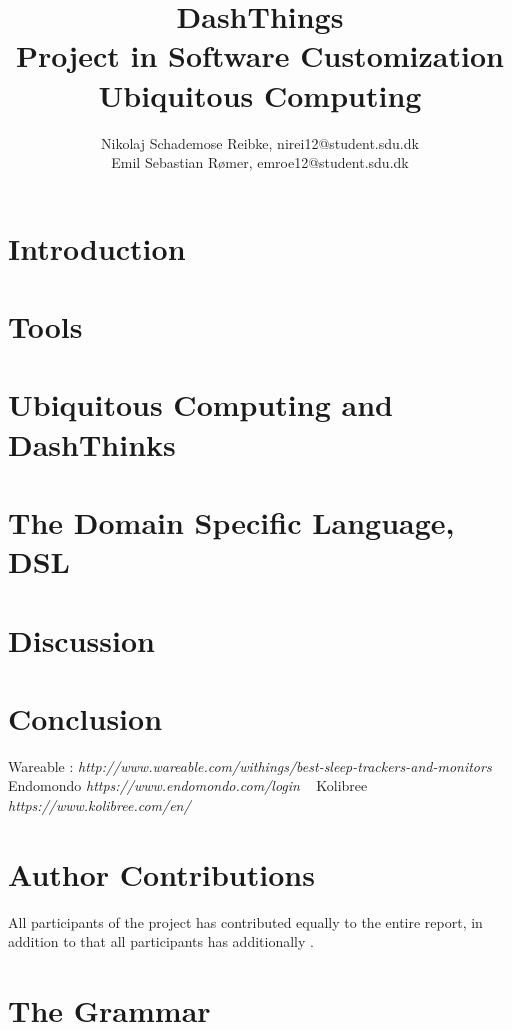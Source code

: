 \documentclass[10pt,a4paper,twocolumn]{article}
\begin{document}
\title{\textbf{DashThings \\ Project in Software Customization Ubiquitous Computing}}

\author{Nikolaj Schademose Reibke, nirei12@student.sdu.dk\\Emil Sebastian R{\o}mer, emroe12@student.sdu.dk}

\maketitle

\section{Introduction}


\section{Tools}


\section{Ubiquitous Computing and DashThinks}


\section{The Domain Specific Language, DSL}


\section{Discussion}


\section{Conclusion}


\begin{thebibliography}{1}
 Wareable : \textit{http://www.wareable.com/withings/best-sleep-trackers-and-monitors} 
 Endomondo \textit{https://www.endomondo.com/login}
\
 Kolibree \textit{https://www.kolibree.com/en/}
\end{thebibliography}

\appendix
\section{Author Contributions}
All participants of the project has contributed equally to the entire report,
in addition to that all participants has additionally .

\section{The Grammar}

\end{document}
